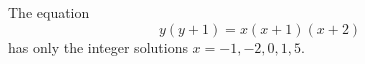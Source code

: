\begin{proposition}
    The equation
\[
    y(y+1)=x(x+1)(x+2)
\]
    has only the integer solutions $x=-1,-2,0,1,5$.
\end{proposition}
